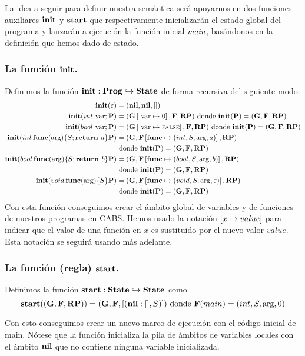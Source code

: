La idea a seguir para definir nuestra semántica será apoyarnos en dos funciones auxiliares $\textbf{init}$ y $\textbf{start}$ que respectivamente inicializarán el estado global del programa y lanzarán a ejecución la función inicial $\textit{main}$, basándonos en la definición que hemos dado de estado.

\subsubsection{La función $\textbf{init}$.}
Definimos la función $\textbf{init}: \textbf{Prog} \hookrightarrow \textbf{State}$ de forma recursiva del siguiente modo.
\begin{align*}
  \textbf{init}(\varepsilon) &= (\textbf{nil}, \textbf{nil}, [])\\
  \textbf{init}(int \text{ var} \mbox{;\,} \mathbf{P}) &= (\mathbf{G}\left[ \text{ var}\mapsto0 \right], \mathbf{F}, \textbf{RP}) \text{ donde } \textbf{init}(\mathbf{P}) = (\mathbf{G}, \mathbf{F}, \textbf{RP})\\
  \textbf{init}(bool \text{ var} \mbox{;\,} \mathbf{P}) &= (\mathbf{G}\left[ \text{ var}\mapsto\text{\scriptsize{FALSE}} \right], \mathbf{F}, \textbf{RP}) \text{ donde } \textbf{init}(\mathbf{P}) = (\mathbf{G}, \mathbf{F}, \textbf{RP})\\
  \textbf{init}(int \, \textbf{func}(\text{arg}) \{ S\mbox{;\,} \textbf{return } a\} \mathbf{P}) &= (\mathbf{G}, \mathbf{F}\left[ \textbf{func}\mapsto(int, S, \text{arg}, a) \right], \textbf{RP}) \\ &\text{ donde } \textbf{init}(\mathbf{P}) = (\mathbf{G}, \mathbf{F}, \textbf{RP})\\
  \textbf{init}(bool \, \textbf{func}(\text{arg}) \{ S\mbox{;\,} \textbf{return } b\} \mathbf{P}) &= (\mathbf{G}, \mathbf{F}\left[ \textbf{func}\mapsto(bool, S, \text{arg}, b) \right], \textbf{RP}) \\ &\text{ donde } \textbf{init}(\mathbf{P}) = (\mathbf{G}, \mathbf{F}, \textbf{RP})\\
  \textbf{init}(void \, \textbf{func}(\text{arg}) \{ S\} \mathbf{P}) &= (\mathbf{G}, \mathbf{F}\left[ \textbf{func}\mapsto(void, S, \text{arg}, \varepsilon) \right], \textbf{RP}) \\ &\text{ donde } \textbf{init}(\mathbf{P}) = (\mathbf{G}, \mathbf{F}, \textbf{RP})\\
\end{align*}
Con esta función conseguimos crear el ámbito global de variables y de funciones de nuestros programas en CABS. Hemos usado la notación $\left[ x\mapsto value \right]$ para indicar que el valor de una función en $x$ es sustituido por el nuevo valor $value$. Esta notación se seguirá usando más adelante.

\subsubsection{La función (regla) $\textbf{start}$.}
Definimos la función $\textbf{start}: \textbf{State} \hookrightarrow \textbf{State}$ como
$$
\textbf{start}((\mathbf{G}, \mathbf{F}, \textbf{RP})) = (\mathbf{G}, \mathbf{F}, [(\textbf{nil}:[], S)]) \text{ donde } \mathbf{F}(main) = (int, S, \text{arg}, 0)
$$

Con esto conseguimos crear un nuevo marco de ejecución con el código inicial de main. Nótese que la función inicializa la pila de ámbitos de variables locales con el ámbito $\textbf{nil}$ que no contiene ninguna variable inicializada.

